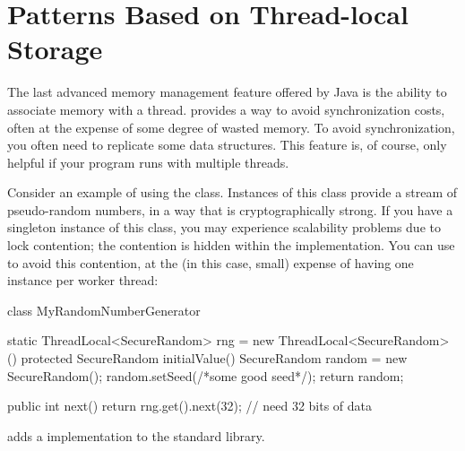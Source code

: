 \begin{comment}
Resource pooling only makes sense if the allocations themselves are expensive.
There are several reasons why a Java object can be expensive to allocate.
Creating and zeroing a large array\index{Large Arrays} in each iteration of a
loop can bog down performance. Creating a new key object to determine whether an
value exists in a map can sometimes contribute a great deal to the load of
temporary objects.

\index{Connection Pools}
A more important example of the need for amortizing the time cost of allocation
comes when this Java object is a proxy for resources outside of Java. If your
application accesses a relational database through the JDBC\index{JDBC}
interface, you will experience the need for resource pooling. There are two kinds
of objects that serve as proxies for resources involving database access. First
are the connections to the database. In most operating systems, establishing a
network connection is an expensive proposition. It also involves reservation of
resoures in the database process. Second are the precompiled SQL statements that
your application uses. As with the connections, these involve setup cost, of the
compilation itself, as well as the reservation of memory resources, that the
database uses to cache certain information about the query.
\end{comment}

\section{Patterns Based on Thread-local Storage}

The last advanced memory management feature offered by Java is the ability to
associate memory with a thread. \Tls provides a way to avoid
synchronization costs, often at the expense of some degree of wasted memory. To
avoid synchronization, you often need to replicate some data structures. This
feature is, of course, only helpful if your program runs with multiple threads.

Consider an example of using the  class. Instances of this
class provide a stream of pseudo-random numbers, in a way that is
cryptographically strong. If you have a singleton instance of this class, you may
experience scalability problems due to lock contention; the contention is hidden
within the  implementation. You can use \tls
to avoid this contention, at the (in this case, small) expense of having one
instance per worker thread:
\begin{shortlisting}
class MyRandomNumberGenerator {
   static ThreadLocal<SecureRandom> rng = new ThreadLocal<SecureRandom>() {
      protected SecureRandom initialValue() {
         SecureRandom random = new SecureRandom();
         random.setSeed(/*some good seed*/);
         return random;
      }
   }
   
   public int next() {
      return rng.get().next(32); // need 32 bits of data
   }
}
\end{shortlisting} 
\javaseven adds a  implementation to the standard
library.

